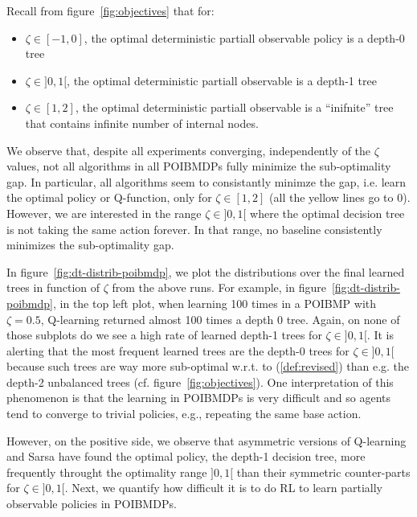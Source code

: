 Recall from figure~\ref{fig:objectives} that for:
\begin{itemize}
    \item $\zeta\in [-1, 0]$, the optimal deterministic partiall observable policy is a depth-0 tree
    \item $\zeta\in ]0, 1[$, the optimal deterministic partiall observable is a depth-1 tree
    \item $\zeta\in [1, 2]$, the optimal deterministic partiall observable is a ``inifnite'' tree that contains infinite number of internal nodes.
\end{itemize}
We observe that, despite all experiments converging, independently of the $\zeta$ values, not all algorithms in all POIBMDPs fully minimize the sub-optimality gap.
In particular, all algorithms seem to consistantly minimze the gap, i.e. learn the optimal policy or Q-function, only for $\zeta \in [1, 2]$ (all the yellow lines go to 0).
However, we are interested in the range $\zeta\in ]0, 1[$ where the optimal decision tree is not taking the same action forever.
In that range, no baseline consistently minimizes the sub-optimality gap.


In figure~\ref{fig:dt-distrib-poibmdp}, we plot the distributions over the final learned trees in function of $\zeta$ from the above runs.
For example, in figure~\ref{fig:dt-distrib-poibmdp}, in the top left plot, when learning 100 times in a POIBMP with $\zeta=0.5$, Q-learning returned almost 100 times a depth 0 tree.
Again, on none of those subplots do we see a high rate of learned depth-1 trees for $\zeta\in ]0, 1[$.
It is alerting that the most frequent learned trees are the depth-0 trees for $\zeta\in ]0, 1[$ because such trees are way more sub-optimal w.r.t. to (\ref{def:revised}) than e.g. the depth-2 unbalanced trees (cf. figure~\ref{fig:objectives}).  
One interpretation of this phenomenon is that the learning in POIBMDPs is very difficult and so agents tend to converge to trivial policies, e.g., repeating the same base action.

However, on the positive side, we observe that asymmetric versions of Q-learning and Sarsa have found the optimal policy, the depth-1 decision tree, more frequently throught the optimality range $]0,1[$ than their symmetric counter-parts for $\zeta\in ]0, 1[$.
Next, we quantify how difficult it is to do RL to learn partially observable policies in POIBMDPs.

